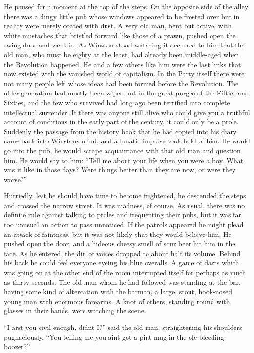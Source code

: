 He paused for a moment at the top of the steps. On the opposite side of
the alley there was a dingy little pub whose windows appeared to be
frosted over but in reality were merely coated with dust. A very old
man, bent but active, with white mustaches that bristled forward like
those of a prawn, pushed open the swing door and went in. As Winston
stood watching it occurred to him that the old man, who must be eighty
at the least, had already been middle-aged when the Revolution happened.
He and a few others like him were the last links that now existed with
the vanished world of capitalism. In the Party itself there were not
many people left whose ideas had been formed before the Revolution. The
older generation had mostly been wiped out in the great purges of the
Fifties and Sixties, and the few who survived had long ago been
terrified into complete intellectual surrender. If there was anyone
still alive who could give you a truthful account of conditions in the
early part of the century, it could only be a prole. Suddenly the
passage from the history book that he had copied into his diary came
back into Winston\textquotesingle s mind, and a lunatic impulse took
hold of him. He would go into the pub, he would scrape acquaintance with
that old man and question him. He would say to him: ``Tell me about your
life when you were a boy. What was it like in those days? Were things
better than they are now, or were they worse?''

Hurriedly, lest he should have time to become frightened, he descended
the steps and crossed the narrow street. It was madness, of course. As
usual, there was no definite rule against talking to proles and
frequenting their pubs, but it was far too unusual an action to pass
unnoticed. If the patrols appeared he might plead an attack of
faintness, but it was not likely that they would believe him. He pushed
open the door, and a hideous cheesy smell of sour beer hit him in the
face. As he entered, the din of voices dropped to about half its volume.
Behind his back he could feel everyone eyeing his blue overalls. A game
of darts which was going on at the other end of the room interrupted
itself for perhaps as much as thirty seconds. The old man whom he had
followed was standing at the bar, having some kind of altercation with
the barman, a large, stout, hook-nosed young man with enormous forearms.
A knot of others, standing round with glasses in their hands, were
watching the scene.

``I arst you civil enough, didn\textquotesingle t I?'' said the old man,
straightening his shoulders pugnaciously. ``You telling me you
ain\textquotesingle t got a pint mug in the \textquotesingle ole
bleeding boozer?''

